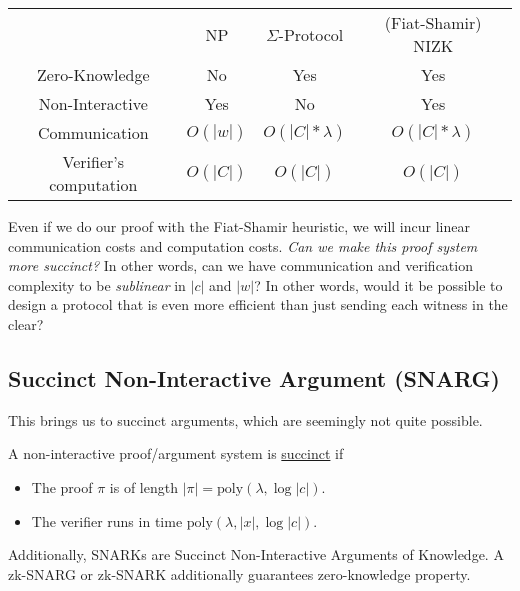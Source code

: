 \begin{center}
    \begin{tabular}{c|c|c|c}
        & NP & $\Sigma$-Protocol & (Fiat-Shamir) NIZK \\
        Zero-Knowledge & No & Yes & Yes\\
        Non-Interactive & Yes & No & Yes\\
        Communication & $O(|w|)$ & $O(|C|*\lambda)$ & $O(|C|*\lambda)$ \\
        Verifier's computation & $O(|C|)$ & $O(|C|)$ & $O(|C|)$ \\
    \end{tabular}
\end{center}

Even if we do our proof with the Fiat-Shamir heuristic, we will incur linear communication costs and computation costs. 
\emph{Can we make this proof system more succinct?} In other words, can we have communication and verification complexity to be \emph{sublinear} in $|c|$ and $|w|$? In other words, would it be possible to design a protocol that is even more efficient than just sending each witness in the clear?

\subsection{Succinct Non-Interactive Argument (SNARG)}
This brings us to succinct arguments, which are seemingly not quite possible.
\begin{definition}
    A non-interactive proof/argument system is \ul{succinct} if
    \begin{itemize}
        \item The proof $\pi$ is of length $|\pi| = \mathrm{poly}(\lambda, \log |c|)$.
        \item The verifier runs in time $\mathrm{poly}(\lambda, |x|, \log|c|)$.
    \end{itemize}
\end{definition}
Additionally, SNARKs are Succinct Non-Interactive Arguments of Knowledge. A zk-SNARG or zk-SNARK additionally guarantees zero-knowledge property.

